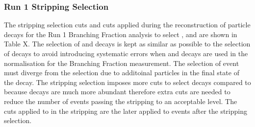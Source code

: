 



\subsubsection{Run 1 Stripping Selection}
\label{strippingold}
The stripping selection cuts and cuts applied during the reconstruction of particle decays for the Run 1 \bmumu Branching Fraction analysis \cite{} to select \bmumu, \bhh and \bujpsik are shown in Table X. The selection of \bujpsik and \bhh decays is kept as similar as possible to the selection of \bsmumu decays to avoid introducing systematic errors when \bhh and \bujpsik decays are used in the normalisation for the Branching Fraction measurement. The selection of \bujpsik event must diverge from the \bsmumu selection due to additoinal particles in the final state of the decay. The stripping selection imposes more cuts to select \bhh decays compared to \bsmumu because \bhh decays are much more abundant therefore extra cuts are needed to reduce the number of events passing the stripping to an acceptable level. The cuts applied to \bhh in the stripping are the later applied to \bsmumu events after the stripping selection. 


